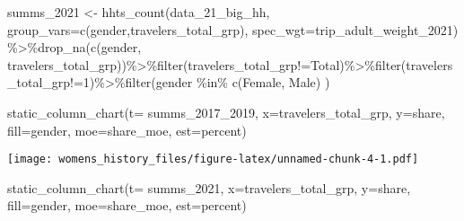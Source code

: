 \documentclass[
  12pt,
]{article}
\newenvironment{Shaded}{\begin{snugshade}}{\end{snugshade}}
\newcommand{\AttributeTok}[1]{\textcolor[rgb]{0.77,0.63,0.00}{#1}}
\newcommand{\FunctionTok}[1]{\textcolor[rgb]{0.00,0.00,0.00}{#1}}
\newcommand{\NormalTok}[1]{#1}
\newcommand{\OtherTok}[1]{\textcolor[rgb]{0.56,0.35,0.01}{#1}}
\newcommand{\SpecialCharTok}[1]{\textcolor[rgb]{0.00,0.00,0.00}{#1}}
\newcommand{\StringTok}[1]{\textcolor[rgb]{0.31,0.60,0.02}{#1}}
\begin{document}
\begin{Shaded}
\begin{Highlighting}[]
\NormalTok{  summs\_2021 }\OtherTok{\textless{}{-}} \FunctionTok{hhts\_count}\NormalTok{(data\_21\_big\_hh,}
                                   \AttributeTok{group\_vars=}\FunctionTok{c}\NormalTok{(}\StringTok{\textquotesingle{}gender\textquotesingle{}}\NormalTok{,}\StringTok{\textquotesingle{}travelers\_total\_grp\textquotesingle{}}\NormalTok{),}
                                   \AttributeTok{spec\_wgt=}\StringTok{\textquotesingle{}trip\_adult\_weight\_2021\textquotesingle{}}\NormalTok{) }\SpecialCharTok{\%\textgreater{}\%}\FunctionTok{drop\_na}\NormalTok{(}\FunctionTok{c}\NormalTok{(}\StringTok{\textquotesingle{}gender\textquotesingle{}}\NormalTok{, }\StringTok{\textquotesingle{}travelers\_total\_grp\textquotesingle{}}\NormalTok{))}\SpecialCharTok{\%\textgreater{}\%}\FunctionTok{filter}\NormalTok{(travelers\_total\_grp}\SpecialCharTok{!=}\StringTok{\textquotesingle{}Total\textquotesingle{}}\NormalTok{)}\SpecialCharTok{\%\textgreater{}\%}\FunctionTok{filter}\NormalTok{(travelers\_total\_grp}\SpecialCharTok{!=}\StringTok{\textquotesingle{}1\textquotesingle{}}\NormalTok{)}\SpecialCharTok{\%\textgreater{}\%}\FunctionTok{filter}\NormalTok{(gender }\SpecialCharTok{\%in\%} \FunctionTok{c}\NormalTok{(}\StringTok{\textquotesingle{}Female\textquotesingle{}}\NormalTok{, }\StringTok{\textquotesingle{}Male\textquotesingle{}}\NormalTok{) )}
  
 

\FunctionTok{static\_column\_chart}\NormalTok{(}\AttributeTok{t=}\NormalTok{ summs\_2017\_2019, }\AttributeTok{x=}\StringTok{\textquotesingle{}travelers\_total\_grp\textquotesingle{}}\NormalTok{, }\AttributeTok{y=}\StringTok{\textquotesingle{}share\textquotesingle{}}\NormalTok{,  }\AttributeTok{fill=}\StringTok{\textquotesingle{}gender\textquotesingle{}}\NormalTok{, }\AttributeTok{moe=}\StringTok{\textquotesingle{}share\_moe\textquotesingle{}}\NormalTok{, }\AttributeTok{est=}\StringTok{\textquotesingle{}percent\textquotesingle{}}\NormalTok{)}
\end{Highlighting}
\end{Shaded}

\texttt{[image: womens\_history\_files/figure-latex/unnamed-chunk-4-1.pdf]}

\begin{Shaded}
\begin{Highlighting}[]
\FunctionTok{static\_column\_chart}\NormalTok{(}\AttributeTok{t=}\NormalTok{ summs\_2021, }\AttributeTok{x=}\StringTok{\textquotesingle{}travelers\_total\_grp\textquotesingle{}}\NormalTok{, }\AttributeTok{y=}\StringTok{\textquotesingle{}share\textquotesingle{}}\NormalTok{,  }\AttributeTok{fill=}\StringTok{\textquotesingle{}gender\textquotesingle{}}\NormalTok{, }\AttributeTok{moe=}\StringTok{\textquotesingle{}share\_moe\textquotesingle{}}\NormalTok{, }\AttributeTok{est=}\StringTok{\textquotesingle{}percent\textquotesingle{}}\NormalTok{)}
\end{Highlighting}
\end{Shaded}
\end{document}
